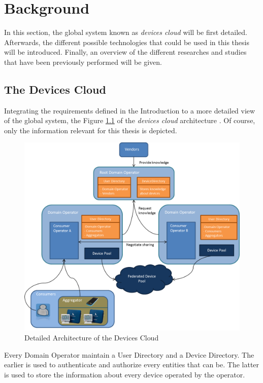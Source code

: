 \chapter{Background}
\label{cha:relatedwork}

In this section, the global system known as \emph{devices cloud} will be first detailed. Afterwards, the different possible technologies that could be used in this thesis will be introduced. Finally, an overview of the different researches and studies that have been previously performed will be given.
 
\section{The Devices Cloud}
Integrating the requirements defined in the Introduction to a more detailed view of the global system, the Figure \ref{fig:design_complete} of the \emph{devices cloud} architecture . Of course, only the information relevant for this thesis is depicted.

\begin{figure}[!ht]
	\centering
	\includegraphics[scale=0.3]{images/design_complete}
	\caption{Detailed Architecture of the Devices Cloud}
	\label{fig:design_complete}
\end{figure}

Every Domain Operator maintain a User Directory and a Device Directory. The earlier is used to authenticate and authorize every entities that can be. The latter is used to store the information about every device operated by the operator.

